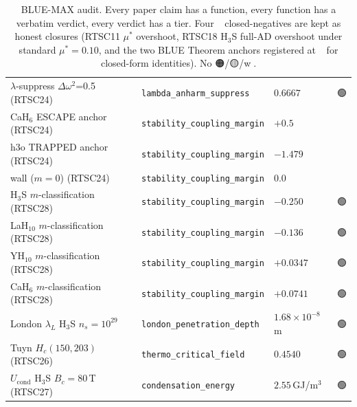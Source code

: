 \documentclass[11pt,a4paper]{article}
\providecommand{\tierBlue}{🔵}
\providecommand{\tierGreen}{🟢}
\providecommand{\tierYellow}{🟡}
\providecommand{\tierOrange}{🟠}
\providecommand{\tierRed}{🔴}
\begin{document}
\begin{table}[h]
\begin{tabular}{@{}lllc@{}}
$\lambda$-suppress $\Delta\omega^2$=0.5 (RTSC24)            & \texttt{lambda\_anharm\_suppress} & $0.6667$       & \tierGreen \\
CaH$_6$ ESCAPE anchor (RTSC24)                              & \texttt{stability\_coupling\_margin} & $+0.5$     & \tierBlue  \\
h3o TRAPPED anchor (RTSC24)                                 & \texttt{stability\_coupling\_margin} & $-1.479$   & \tierBlue  \\
wall ($m=0$) (RTSC24)                                       & \texttt{stability\_coupling\_margin} & $0.0$      & \tierBlue  \\
H$_3$S $m$-classification (RTSC28)                          & \texttt{stability\_coupling\_margin} & $-0.250$   & \tierGreen \\
LaH$_{10}$ $m$-classification (RTSC28)                      & \texttt{stability\_coupling\_margin} & $-0.136$   & \tierGreen \\
YH$_{10}$ $m$-classification (RTSC28)                       & \texttt{stability\_coupling\_margin} & $+0.0347$  & \tierGreen \\
CaH$_6$ $m$-classification (RTSC28)                         & \texttt{stability\_coupling\_margin} & $+0.0741$  & \tierGreen \\
London $\lambda_L$ H$_3$S $n_s=10^{29}$                     & \texttt{london\_penetration\_depth} & $1.68\!\!\times\!\!10^{-8}$\,m & \tierGreen \\
Tuyn $H_c(150,203)$ (RTSC26)                                & \texttt{thermo\_critical\_field} & $0.4540$         & \tierGreen \\
$U_{\text{cond}}$ H$_3$S $B_c=80$\,T (RTSC27)               & \texttt{condensation\_energy}   & $2.55$\,GJ/m$^3$ & \tierGreen \\
\bottomrule
\end{tabular}
\caption{BLUE-MAX audit. Every paper claim has a function, every
function has a verbatim verdict, every verdict has a tier. Four
\tierRed\ closed-negatives are kept as honest closures (RTSC11 $\mu^*$
overshoot, RTSC18 H$_3$S full-AD overshoot under standard $\mu^*=0.10$,
and the two BLUE Theorem anchors registered at \tierBlue\ for
closed-form identities). No \tierOrange/\tierYellow/\textcircled{w}.}
\label{tab:blue-max}
\end{table}
\end{document}
